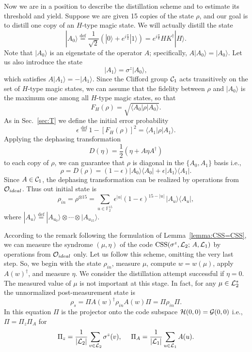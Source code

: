 \documentclass[pra,twocolumn,showpacs]{revtex4}
\newcommand{\FF}{\mathbb{F}}
\newcommand{\calL}{{\cal L }}
\newcommand{\calH}{{\cal H }}
\newcommand{\calG}{{\cal G }}
\newcommand{\calO}{{\cal O }}
\newcommand{\la}{\langle}
\newcommand{\ra}{\rangle}
\newcommand*{\Cl}[1]{{\cal C}_{#1}}
\newcommand{\bydef}{\stackrel{\mathrm{def}}{=}}
\newcommand{\ep}{\epsilon}
\newcommand{\sz}{\sigma^z}
\newcommand{\Hh}{$H$}
\DeclareMathOperator*{\CSS}{\mathop{\mathrm{CSS}}}
\begin{document}
Now we are in a position to describe the distillation scheme and to estimate
its threshold and yield. Suppose we are given 15 copies of the state $\rho$,
and our goal is to distill one copy of an \Hh-type magic state.  We will
actually distill the state
\[
|A_0\ra \bydef \frac1{\sqrt{2}} \left( |0\ra + e^{i\frac{\pi}4} |1\ra \right)=
e^{i\frac{\pi}8} H K^\dag |H\ra.
\]
Note that $|A_0\ra$ is an eigenstate of the operator $A$; specifically,
$A|A_0\ra=|A_0\ra$. Let us also introduce the state 
\[
|A_1\ra=\sz |A_0\ra,
\]
which satisfies $A|A_1\ra=-|A_1\ra$. 
Since the Clifford group $\Cl{1}$ acts transitively on the set of \Hh-type
magic states, we can assume that the fidelity
between $\rho$ and $|A_0\ra$ is the maximum one among all \Hh-type magic states,
so that
\[
F_H(\rho) = \sqrt{\la A_0|\rho|A_0\ra}.
\]
As in Sec.~\ref{sec:T} we define the initial error probability
\[
\ep \bydef 1 - [F_H(\rho)]^2 = \la A_1|\rho|A_1\ra.
\]
Applying the dephasing transformation
\[
D(\eta)=\frac12 \left( \eta + A\eta A^\dag\right)
\]
to each copy of $\rho$, we can guarantee that $\rho$ is diagonal in the $\{
A_0, A_1\}$ basis i.e.,
\[
\rho = D(\rho)= (1-\ep) |A_0\ra\la A_0| + \ep |A_1\ra\la A_1|.
\]
Since $A\in \Cl{1}$, the dephasing transformation  can be realized by
operations from $\calO_{ideal}$. Thus out initial state is
\begin{equation}\label{H-initial}
\rho_{in} = \rho^{\otimes 15}
=\sum_{u\in \FF_2^{15}} \ep^{|u|} (1-\ep)^{15-|u|}\,
|A_u\ra\la A_u|,
\end{equation}
where $|A_u\ra\bydef |A_{u_{0}}\ra\otimes\cdots\otimes|A_{u_{15}}\ra$.

According to the remark following
the formulation of Lemma~\ref{lemma:CSS=CSS}, we can
measure the syndrome $(\mu,\eta)$ of the code $\CSS(\sz, \calL_2;\, A,
\calL_1)$ by operations from $\calO_{ideal}$ only. Let us follow this scheme,
omitting the very last step. So, we begin with the state $\rho_{in}$, measure
$\mu$, compute $w=w(\mu)$, apply $A(w)^{\dag}$, and measure $\eta$. We
consider the distillation attempt successful if $\eta=0$. The measured value of
$\mu$ is not important at this stage. In fact, for any $\mu\in\calL_2^*$ the
unnormalized post-measurement state is
\[
\rho_{s}=\Pi A(w)^{\dag}\rho_{in} A(w)\Pi = \Pi\rho_{in}\Pi.
\]
In this equation
$\Pi$ is the projector onto the code subspace $\calH(0,0)=\calG(0,0)$
i.e., $\Pi=\Pi_{z}\Pi_{A}$ for
\begin{equation}\label{AZ-proj}
\Pi_{z}=\frac1{|\calL_2|} \sum_{v\in \calL_2} \sz(v),\quad\
\Pi_{A}=\frac1{|\calL_1|} \sum_{u\in \calL_1} A(u).
\end{equation}
\end{document}
